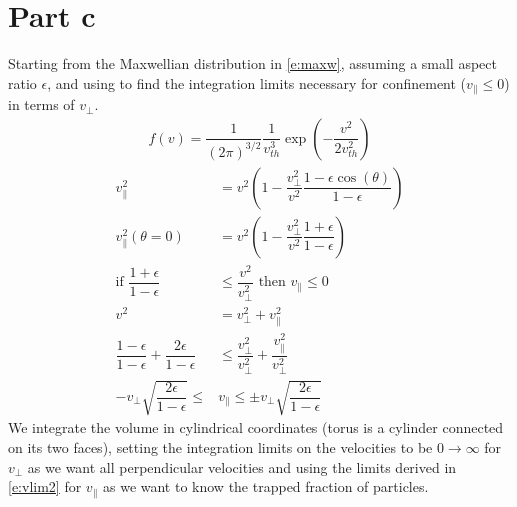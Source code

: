 \documentclass[10pt,a4paper]{article}
\begin{document}
	\section{Part c}
	Starting from the Maxwellian distribution in \cref{e:maxw}, assuming a small aspect ratio $\epsilon$, and using  to find the integration limits necessary for confinement ($v_{\parallel} \leq 0$) in terms of $v_{\perp}$.
	\begin{align}
		f(v) = \dfrac{1}{(2 \pi)^{3/2}} \dfrac{1}{v_{th}^{3}} \exp \left(- \dfrac{v^{2}}{2 v_{th}^{2}}\right)
		\label{e:maxw}
	\end{align}
	\begin{subequations}
		\begin{align}
			v_{\parallel}^{2} &= v^{2} \left(1 - \dfrac{v_{\perp}^{2}}{v^{2}} \dfrac{1 - \epsilon \cos(\theta)}{1-\epsilon}\right) \label{e:vlim1}\\
			v_{\parallel}^{2}(\theta = 0) &= v^{2} \left(1 - \dfrac{v_{\perp}^{2}}{v^{2}} \dfrac{1+\epsilon }{1-\epsilon}\right) \\
			\textrm{if } \dfrac{1+\epsilon }{1-\epsilon} &\leq \dfrac{v^{2}}{v_{\perp}^{2}}  \textrm{ then } v_{\parallel} \leq 0 \\
			v^{2} &= v_{\perp}^{2} + v_{\parallel}^{2} \\
			\dfrac{1 - \epsilon }{1-\epsilon} + \dfrac{2 \epsilon}{1-\epsilon} &\leq \dfrac{v_{\perp}^{2}}{v_{\perp}^{2}} + \dfrac{v_{\parallel}^{2}}{v_{\perp}^{2}} \\
			- v_{\perp} \sqrt{\dfrac{2\epsilon}{1-\epsilon}} \leq &v_{\parallel} \leq \pm v_{\perp} \sqrt{\dfrac{2\epsilon}{1-\epsilon}}
			\label{e:vlim2}
		\end{align}
	\end{subequations}
	We integrate the volume in cylindrical coordinates (torus is a cylinder connected on its two faces), setting the integration limits on the velocities to be $0 \rightarrow \infty$ for $v_{\perp}$ as we want all perpendicular velocities and using the limits derived in \cref{e:vlim2} for $v_{\parallel}$ as we want to know the trapped fraction of particles.
\end{document}

